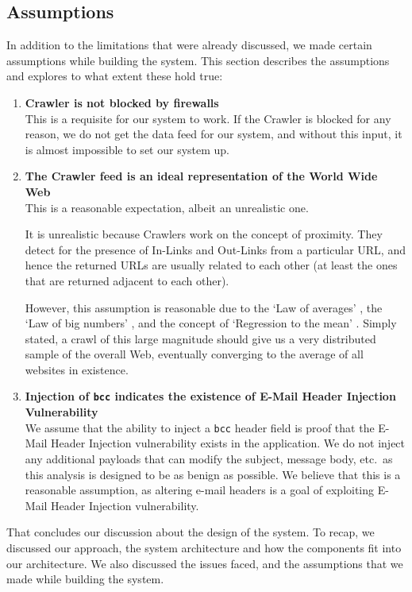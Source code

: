 \subsection{Assumptions}
In addition to the limitations that were already discussed, we made certain assumptions while building the system. This section describes the assumptions and explores to what extent these hold true:
\begin{enumerate}
	\item \textbf{Crawler is not blocked by firewalls}\\
	This is a requisite for our system to work. If the Crawler is blocked for any reason, we do not get the data feed for our system, and without this input, it is almost impossible to set our system up.
	
	\item \textbf{The Crawler feed is an ideal representation of the World Wide Web} \\
	This is a reasonable expectation, albeit an unrealistic one.
	
	It is unrealistic because Crawlers work on the concept of proximity. They detect for the presence of In-Links and Out-Links from a particular URL, and hence the returned URLs are usually related to each other (at least the ones that are returned adjacent to each other).
	
	However, this assumption is reasonable due to the `Law of averages' \cite{wiki:Law_of_averages}, the `Law of big numbers' \cite{wiki:Law_of_large_numbers}, and the concept of `Regression to the mean' \cite{wiki:Regression_toward_the_mean}. Simply stated, a crawl of this large magnitude should give us a very distributed sample of the overall Web, eventually converging to the average of all websites in existence.
	
	\item \textbf{Injection of \texttt{bcc} indicates the existence of E-Mail Header Injection Vulnerability} \\
	We assume that the ability to inject a \texttt{bcc} header field is proof that the E-Mail Header Injection vulnerability exists in the application. We do not inject any additional payloads that can modify the subject, message body, etc.\ as this analysis is designed to be as benign as possible.
	We believe that this is a reasonable assumption, as altering e-mail headers is a goal of exploiting E-Mail Header Injection vulnerability.
\end{enumerate}

That concludes our discussion about the design of the system. To recap, we discussed our approach, the system architecture and how the components fit into our architecture. We also discussed the issues faced, and the assumptions that we made while building the system. %